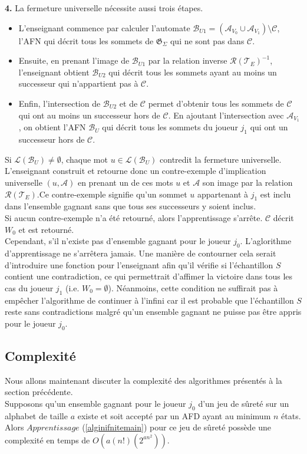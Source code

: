 \documentclass[12pt,a4paper,oneside,titlepage]{report}
\begin{document}
\noindent\textbf{4.} La fermeture universelle nécessite aussi trois étapes.
\begin{itemize}
\item L'enseignant commence par calculer l'automate $\mathcal{B}_{U1}=(\mathcal{A}_{V_0}\cup\mathcal{A}_{V_1})\setminus\mathcal{C}$, l'AFN qui décrit tous les sommets de $\mathfrak{G}_\Sigma$ qui ne sont pas dans $\mathcal{C}$. 
\item Ensuite, en prenant l'image de $\mathcal{B}_{U1}$ par la relation inverse $\mathcal{R}(\mathcal{T}_E)^{-1}$, l'enseignant obtient $\mathcal{B}_{U2}$ qui décrit tous les sommets ayant au moins un successeur qui n'appartient pas à $\mathcal{C}$. 
\item Enfin, l'intersection de $\mathcal{B}_{U2}$ et de $\mathcal{C}$ permet d'obtenir tous les sommets de $\mathcal{C}$ qui ont au moins un successeur hors de $\mathcal{C}$. En ajoutant l'intersection avec $\mathcal{A}_{V_1}$, on obtient l'AFN $\mathcal{B}_U$ qui décrit tous les sommets du joueur $j_1$ qui ont un successeur hors de $\mathcal{C}$. 
\end{itemize}
Si $\mathcal{L}(\mathcal{B}_U)\neq\emptyset$, chaque mot $u\in\mathcal{L}(\mathcal{B}_U)$ contredit la fermeture universelle. L'enseignant construit et retourne donc un contre-exemple d'implication universelle $(u,\mathcal{A})$ en prenant un de ces mots $u$ et $\mathcal{A}$ son image par la relation $\mathcal{R}(\mathcal{T}_E)$.Ce contre-exemple signifie qu'un sommet $u$ appartenant à $j_1$ est inclu dans l'ensemble gagnant sans que tous ses successeurs y soient inclus.\\

\noindent Si aucun contre-exemple n'a été retourné, alors l'apprentissage s'arrête. $\mathcal{C}$ décrit $W_0$ et est retourné.\\

Cependant, s'il n'existe pas d'ensemble gagnant pour le joueur $j_0$. L'aglorithme d'apprentissage ne s'arrêtera jamais. Une manière de contourner cela serait d'introduire une fonction pour l'enseignant afin qu'il vérifie si l'échantillon $S$ contient une contradiction, ce qui permettrait d'affimer la victoire dans tous les cas du joueur $j_1$ (i.e. $W_0=\emptyset$). Néanmoins, cette condition ne suffirait pas à empêcher l'algorithme de continuer à l'infini car il est probable que l'échantillon $S$ reste sans contradictions malgré qu'un ensemble gagnant ne puisse pas être appris pour le joueur $j_0$.

\subsection{Complexité}
Nous allons maintenant discuter la complexité des algorithmes présentés à la section précédente.\\
Supposons qu'un ensemble gagnant pour le joueur $j_0$ d'un jeu de sûreté sur un alphabet de taille $a$ existe et soit accepté par un AFD ayant au minimum $n$ états. Alors $Apprentissage$ (\ref{alginifnitemain}) pour ce jeu de sûreté possède une complexité en temps de $O(a(n!)(2^{an^2}))$.\\
\end{document}
